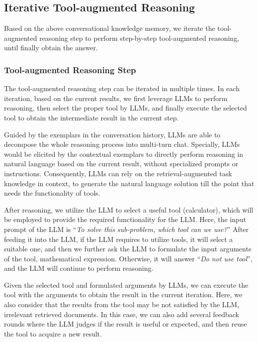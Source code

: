 \subsection{Iterative Tool-augmented Reasoning}
Based on the above conversational knowledge memory, we iterate the tool-augmented reasoning step to perform step-by-step tool-augmented reasoning, until finally obtain the answer.

\subsubsection{Tool-augmented Reasoning Step}
The tool-augmented reasoning step can be iterated in multiple times. 
In each iteration, based on the current results, we first leverage LLMs to perform reasoning, then select the proper tool by LLMs, and finally execute the selected tool to obtain the intermediate result in the current step.

Guided by the exemplars in the conversation history, LLMs are able to decompose the whole reasoning process into multi-turn chat.
Specially, LLMs would be elicited by the contextual exemplars to directly perform reasoning in natural language based on the current result, without specialized prompts or instructions.
Consequently, LLMs can rely on the retrieval-augmented task knowledge in context, to generate the natural language solution till the point that needs the functionality of tools.

After reasoning, we utilize the LLM to select a useful tool (\eg calculator), which will be employed to provide the required functionality for the LLM.
Here, the input prompt of the LLM is ``\emph{To solve this sub-problem, which tool can we use?}''
After feeding it into the LLM, if the LLM requires to utilize tools, it will select a suitable one, and then we further ask the LLM to formulate the input arguments of the tool, \eg mathematical expression.
Otherwise, it will answer ``\emph{Do not use tool}'', and the LLM will continue to perform reasoning.

Given the selected tool and formulated arguments by LLMs, we can execute the tool with the arguments to obtain the result in the current iteration.
Here, we also consider that the results from the tool may be not satisfied by the LLM, \eg irrelevant retrieved documents.
In this case, we can also add several feedback rounds where the LLM judges if the result is useful or expected, and then reuse the tool to acquire a new result.

